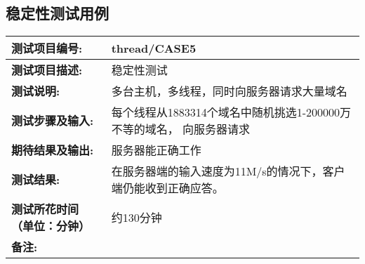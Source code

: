 \subsection{稳定性测试用例}
\begin{table}[H]
\centering
\begin{tabular}{|p{8em}|p{22em}|}
\hline
\textbf{测试项目编号:}&thread/CASE5\\
\hline
\textbf{测试项目描述:}&稳定性测试\\
\hline
\textbf{测试说明:}&多台主机，多线程，同时向服务器请求大量域名\\
\hline
\textbf{测试步骤及输入:}&每个线程从1883314个域名中随机挑选1-200000万不等的域名，
向服务器请求\\
\hline
\textbf{期待结果及输出:}&服务器能正确工作\\
\hline
\textbf{测试结果:}&在服务器端的输入速度为11M/s的情况下，客户端仍能收到正确应答。\\
\hline
\textbf{测试所花时间（单位：分钟）}& 约130分钟\\
\hline
\textbf{备注:}& \\
\hline
\end{tabular}
\end{table}



%
